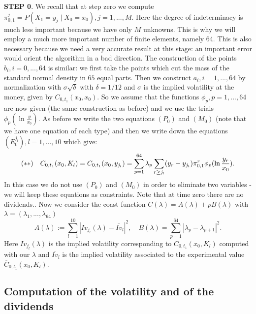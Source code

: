 \documentclass[a4paper]{article}
\begin{document}
\textbf{STEP 0}. We recall that at step zero we compute $\pi
_{0,1}^{j}=P(X_{1}=y_{j}\mid X_{0}=x_{0}),j=1,...,M.$ Here the degree of
indeterminacy is much less important because we have only $M$ unknowns. This
is why we will employ a much more important number of finite elements,
namely 64. This is also necessary because we need a very accurate result at
this stage: an important error would orient the algorithm in a bad
direction. The construction of the points $b_{i},i=0,...,64$ is similar: we
first take the points which cut the mass of the standard normal density in $%
65$ equal parts. Then we construct $a_{i},i=1,...,64$ by normalization with $%
\sigma \sqrt{\delta }$ with $\delta =1/12$ and $\sigma $ is the implied
volatility at the money, given by $C_{0,t_{1}}(x_{0},x_{0}).$ So we assume
that the functions $\phi _{p},p=1,...,64$ are now given (the same
construction as before) and we use the trials $\phi _{p}(\ln \frac{y}{x_{0}}%
).$ As before we write the two equations $(P_{0})$ and $(M_{0})$ (note that
we have one equation of each type) and then we write down the equations $%
(E_{0}^{j_{l}}),l=1,...,10$ which give:
\[
(**)\quad
C_{0,t_{1}}(x_{0},K_{l})=C_{0,t_{1}}(x_{0},y_{j_{l}})=\sum_{p=1}^{64}\lambda
_{p}\sum_{r\geq j_{l}}(y_{r}-y_{j_{l}})\pi _{0,1}^{r}\phi _{p}(\ln \frac{%
y_{r}}{x_{0}}).
\]
In this case we do not use $(P_{0})$ and $(M_{0})$ in order to eliminate two
variables - we will keep these equations as constraints. Note that at time
zero there are no dividends.. Now we consider the coast function $C(\lambda
)=A(\lambda )+pB(\lambda )$ with $\lambda =(\lambda _{1},...,\lambda _{64})$%
\[
A(\lambda ):=\sum_{l=1}^{10}\left| Iv_{j_{l}}(\lambda )-\overline{Iv}%
_{l}\right| ^{2},\quad B(\lambda )=\sum_{p=1}^{64}\left| \lambda
_{p}-\lambda _{p+1}\right| ^{2}.
\]
Here $Iv_{j_{l}}(\lambda )$ is the implied volatility corresponding to $%
C_{0,t_{1}}(x_{0},K_{l})$ computed with our $\lambda $ and $\overline{Iv}%
_{l} $ is the implied volatility associated to the experimental value $%
\overline{C}_{0,t_{1}}(x_{0},K_{l}).$

\subsection{Computation of the volatility and of the dividends}
\end{document}
